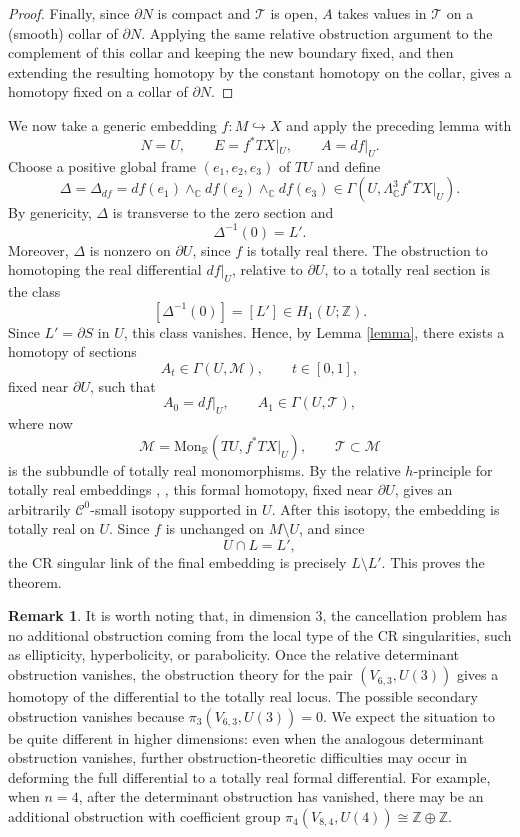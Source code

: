 \documentclass[12pt]{amsart}
\theoremstyle{definition}
\newtheorem{remark}[theorem]{Remark}
\newcommand{\C}{\mathbb{C}}
\newcommand{\Z}{\mathbb{Z}}
\newcommand{\R}{\mathbb{R}}
\newcommand{\cC}{\mathcal{C}}
\newcommand{\cM}{\mathcal{M}}
\newcommand{\cT}{\mathcal{T}}
\newcommand\hra{\hookrightarrow}
\newcommand\Mon{\mathrm{Mon}}
\numberwithin{equation}{section}
\begin{document}
\begin{proof}
Finally, since $\partial N$ is compact and $\cT$ is open, $A$ takes values in $\cT$ on a (smooth) collar of $\partial N$. 
Applying the same relative obstruction argument to the complement of this collar and keeping the new boundary fixed, and then extending the resulting homotopy by the constant homotopy on the collar, gives a homotopy fixed on a collar of $\partial N$.
\end{proof}


We now take a generic embedding $f:M\hra X$ and apply the preceding lemma with 
\[N=U,\qquad E=f^*TX|_U,\qquad A=df|_U.\]
Choose a positive global frame $(e_1,e_2,e_3)$ of $TU$ and define
\[\Delta=\Delta_{df}=df(e_1)\wedge_{\C}df(e_2)\wedge_{\C}df(e_3)
       \in \Gamma(U,\Lambda^3_{\C}f^*TX|_U).\]
By genericity, $\Delta$ is transverse to the zero section and
\[ \Delta^{-1}(0)=L'.\] 
Moreover, $\Delta$ is nonzero on $\partial U$, since $f$ is totally real there. The obstruction to homotoping the real differential $df|_U$, relative to $\partial U$, to a totally real section is the class
\[[\Delta^{-1}(0)] = [L'] \in H_1(U;\Z).\]
 Since $L'=\partial S$ in $U$, this class vanishes.
 Hence, by Lemma \ref{lemma}, there exists a homotopy of sections
\[A_t\in \Gamma(U,\cM),\qquad t\in[0,1],
\]
fixed near $\partial U$, such that
\[A_0=df|_U,\qquad A_1\in \Gamma(U,\mathcal T),\]
where now
\[\cM=\Mon_{\R}(TU,f^*TX|_U),\qquad \cT\subset \mathcal M
\]
is the subbundle of totally real monomorphisms.
 By the relative $h$-principle for totally real embeddings \cite[Section 2.4.5]{Gr}, \cite[Section 19.4]{EM}, this formal homotopy, fixed near $\partial U$, gives an arbitrarily $\cC^0$-small isotopy supported in $U$.
 After this isotopy, the embedding is totally real on $U$. Since $f$ is unchanged on $M\setminus U$, and since
\[
U\cap L=L',
\]
the CR singular link of the final embedding is precisely $L\setminus L'$. This proves the theorem.
\begin{remark}
It is worth noting that, in dimension $3$, the cancellation problem has no additional obstruction coming from the local type of the CR singularities, such as ellipticity, hyperbolicity, or parabolicity. Once the relative determinant obstruction vanishes, the obstruction theory for the pair $(V_{6,3},U(3))$ gives a homotopy of the differential to the totally real locus. The possible secondary obstruction vanishes because $\pi_3(V_{6,3},U(3))=0.$ We expect the situation to be quite different in higher dimensions: even when the analogous determinant  obstruction vanishes, further obstruction-theoretic difficulties may occur in deforming the full differential to a totally real formal differential. For example, when $n=4$, after the determinant obstruction has vanished, there may be an additional obstruction with coefficient group $\pi_4(V_{8,4},U(4))\cong \Z\oplus\Z$. 
\end{remark}
\end{document}
